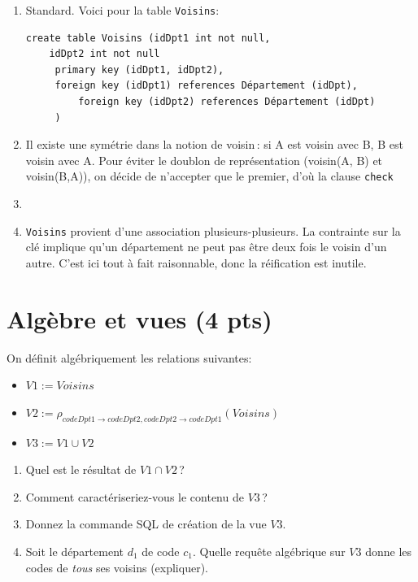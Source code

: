 \begin{solution}
 \begin{enumerate}
 
      \item Standard. Voici pour la table \texttt{Voisins}:
     
\begin{verbatim}
create table Voisins (idDpt1 int not null, 
    idDpt2 int not null
     primary key (idDpt1, idDpt2),
     foreign key (idDpt1) references Département (idDpt),
         foreign key (idDpt2) references Département (idDpt)
     )
\end{verbatim}
  
    \item Il existe une symétrie dans la notion de voisin\,: si A
    est voisin avec B, B est voisin avec A. Pour éviter le doublon
   de représentation (voisin(A, B) et voisin(B,A)), on décide 
   de n'accepter que le premier, d'où la clause \texttt{check} 
     \item 
     
     \item \texttt{Voisins} provient d'une association plusieurs-plusieurs.
     La contrainte sur la clé implique qu'un département ne peut pas
     être deux fois le voisin d'un autre. C'est ici tout à fait raisonnable,
     donc la réification est inutile.
 \end{enumerate}
 
\end{solution}



\section{Algèbre et vues (4 pts)}

On définit algébriquement les relations suivantes:

\begin{itemize}
  \item $V1 := Voisins$
  \item $V2 := \rho_{codeDpt1 \to codeDpt2, codeDpt2 \to codeDpt1} (Voisins)$
  \item $V3 := V1 \cup V2$
\end{itemize}

\begin{enumerate}
  \item Quel est le résultat de $V1 \cap V2$\,?
  \item Comment caractériseriez-vous le contenu  de $V3$\,?
    \item Donnez la commande SQL de création de la vue $V3$.
    \item Soit le département $d_1$  de code 
      $c_1$. Quelle requête algébrique sur $V3$ donne les codes de \emph{tous} ses voisins
      (expliquer). 
\end{enumerate}


